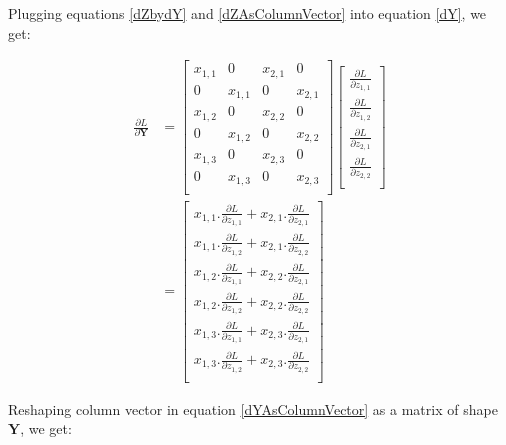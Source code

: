 \documentclass{article}
\newcommand{\matr}[1]{\mathbf{#1}} %
\begin{document}
Plugging equations \ref{dZbydY} and \ref{dZAsColumnVector} into equation \ref{dY}, we get:

\begin{align}
\frac{\partial L}{\partial \matr{Y}} &=
\begin{bmatrix}
x_{1,1} & 0 & x_{2,1} & 0 \\[0.5em]
0 & x_{1,1} & 0 & x_{2,1} \\[0.5em]
x_{1,2} & 0 & x_{2,2} & 0 \\[0.5em]
0 & x_{1,2} & 0 & x_{2,2} \\[0.5em]
x_{1,3} & 0 & x_{2,3} & 0 \\[0.5em]
0 & x_{1,3} & 0 & x_{2,3} \\[0.5em]
\end{bmatrix}
\begin{bmatrix}
\frac{\partial L}{\partial z_{1,1}} \\[0.7em]
\frac{\partial L}{\partial z_{1,2}} \\[0.7em]
\frac{\partial L}{\partial z_{2,1}} \\[0.7em]
\frac{\partial L}{\partial z_{2,2}} \\[0.7em]
\end{bmatrix}
\nonumber \\
&=
\begin{bmatrix}
x_{1,1}.\frac{\partial L}{\partial z_{1,1}} + x_{2,1}.\frac{\partial L}{\partial z_{2,1}} \\[0.7em]
x_{1,1}.\frac{\partial L}{\partial z_{1,2}} + x_{2,1}.\frac{\partial L}{\partial z_{2,2}} \\[0.7em]
x_{1,2}.\frac{\partial L}{\partial z_{1,1}} + x_{2,2}.\frac{\partial L}{\partial z_{2,1}} \\[0.7em]
x_{1,2}.\frac{\partial L}{\partial z_{1,2}} + x_{2,2}.\frac{\partial L}{\partial z_{2,2}} \\[0.7em]
x_{1,3}.\frac{\partial L}{\partial z_{1,1}} + x_{2,3}.\frac{\partial L}{\partial z_{2,1}} \\[0.7em]
x_{1,3}.\frac{\partial L}{\partial z_{1,2}} + x_{2,3}.\frac{\partial L}{\partial z_{2,2}} \\[0.7em]
\end{bmatrix} \label{dYAsColumnVector}
\end{align}

Reshaping column vector in equation \ref{dYAsColumnVector} as a matrix of shape $\matr{Y}$, we get:
\end{document}
